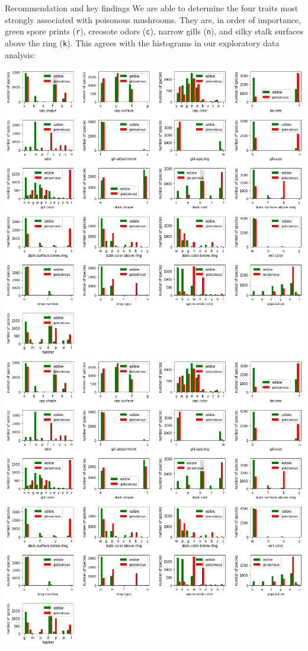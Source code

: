 \documentclass{beamer}
\begin{document}
\begin{frame}{Recommendation and key findings}
We are able to determine the four traits most strongly associated with
poisonous mushrooms. They are, in order of importance, green spore prints
(\texttt{r}), creosote odors (\texttt{c}), narrow gills (\texttt{n}), and
silky stalk surfaces above the ring (\texttt{k}).
This agrees with the histograms in our exploratory data analysis:
\begin{center}
\includegraphics[scale=0.4,trim=460 150 220 570,clip=true]{histograms.png}
\includegraphics[scale=0.4,trim=0 585 680 135,clip=true]{histograms.png}


\end{center}
\end{frame}
\end{document}
